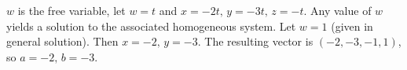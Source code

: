 \begin{enumerate}
$w$ is the free variable, let $w=t$ and $x=-2t,\,y=-3t,\,z=-t.$
Any value of $w$ yields a solution to the associated homogeneous
system. Let $w=1$ (given in general solution). Then $x=-2,\,y=-3$.
The resulting vector is $(-2,-3,-1,1)$, so $a=-2,\,b=-3.$
\end{enumerate}
\newpage
\markboth{}{}